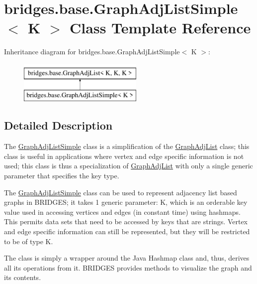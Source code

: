 \hypertarget{classbridges_1_1base_1_1_graph_adj_list_simple}{}\section{bridges.\+base.\+Graph\+Adj\+List\+Simple$<$ K $>$ Class Template Reference}
\label{classbridges_1_1base_1_1_graph_adj_list_simple}
Inheritance diagram for bridges.\+base.\+Graph\+Adj\+List\+Simple$<$ K $>$\+:\begin{figure}[H]
\begin{center}
\leavevmode
\includegraphics[height=2.000000cm]{classbridges_1_1base_1_1_graph_adj_list_simple}
\end{center}
\end{figure}


\subsection{Detailed Description}
The \hyperlink{classbridges_1_1base_1_1_graph_adj_list_simple}{Graph\+Adj\+List\+Simple} class is a simplification of the \hyperlink{classbridges_1_1base_1_1_graph_adj_list}{Graph\+Adj\+List} class; this class is useful in applications where vertex and edge specific information is not used; this class is thus a specialization of \hyperlink{classbridges_1_1base_1_1_graph_adj_list}{Graph\+Adj\+List} with only a single generic parameter that specifies the key type. 

The \hyperlink{classbridges_1_1base_1_1_graph_adj_list_simple}{Graph\+Adj\+List\+Simple} class can be used to represent adjacency list based graphs in B\+R\+I\+D\+G\+ES; it takes 1 generic parameter\+: K, which is an orderable key value used in accessing vertices and edges (in constant time) using hashmaps. This permits data sets that need to be accessed by keys that are strings. Vertex and edge specific information can still be represented, but they will be restricted to be of type K.

The class is simply a wrapper around the Java Hashmap class and, thus, derives all its operations from it. B\+R\+I\+D\+G\+ES provides methods to visualize the graph and its contents.

